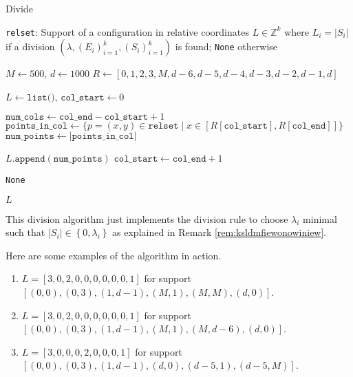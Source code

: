 \begin{algorithm}
\caption{Divide}
\label{alg:divide}
\begin{algorithmic}[1]
\Require \texttt{relset}: Support of a configuration in relative coordinates
\Ensure \( L \in \mathbb{Z}^{k} \) where \( L_i = \lvert S_i \rvert \) if a division \( (\lambda, (E_i)_{i=1}^k, (S_i)_{i=1}^k) \) is found; \texttt{None} otherwise

\State $M \gets 500$, $d \gets 1000$
\State $R \gets [0, 1, 2, 3, M, d-6, d-5, d-4, d-3, d-2, d-1, d]$ 

\State $L \gets \texttt{list()}$, $\texttt{col\_start} \gets 0$

    \State $\texttt{num\_cols} \gets \texttt{col\_end} - \texttt{col\_start} + 1$
    \State $\texttt{points\_in\_col} \gets \{p = (x,y) \in \texttt{relset} \mid x \in [R[\texttt{col\_start}], R[\texttt{col\_end}]]\}$
    \State $\texttt{num\_points} \gets |\texttt{points\_in\_col}|$

        \State $L.\texttt{append}(\texttt{num\_points})$
        \State $\texttt{col\_start} \gets \texttt{col\_end} + 1$
    \EndIf
\EndFor

    \State \Return \texttt{None}
\EndIf

\State \Return $L$
\end{algorithmic}
\end{algorithm}

This division algorithm just implements the division rule to choose \( \lambda_i  \) minimal such that \( \lvert S_i \rvert \in \left\{ 0, \lambda_i \right\} \) as explained in Remark \ref{rem:ksldmfiewonowiniew}.

\begin{example}
    Here are some examples of the algorithm in action.
    \begin{enumerate}
        \item \( L=[3, 0, 2, 0, 0, 0, 0, 0, 0, 1]  \) for support \( [(0, 0), (0, 3), (1, d-1), (M, 1), (M, M), (d, 0)] \).
        \item \( L=[3, 0, 2, 0, 0, 0, 0, 0, 0, 1]  \) for support \( [(0, 0), (0, 3), (1, d-1), (M, 1), (M, d-6), (d, 0)] \).
        \item \( L=[3, 0, 0, 0, 2, 0, 0, 0, 1]  \) for support \( [(0, 0), (0, 3), (1, d-1), (d, 0), (d-5, 1), (d-5, M)] \).
    \end{enumerate}
\end{example}

